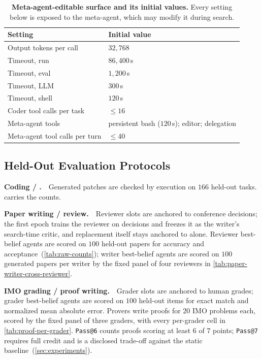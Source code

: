 \begin{table}[ht]
\centering
\caption{\textbf{Meta-agent-editable surface and its initial values.} Every setting below is exposed to the meta-agent, which may modify it during search.}
\label{tab:settings-editable}
\small
\begin{tabular}{@{}ll@{}}
\toprule
Setting & Initial value \\
\midrule
Output tokens per call & $32{,}768$  \\
Timeout, run & $86{,}400$\,s \\
Timeout, eval & $1{,}200$\,s \\
Timeout, LLM & $300$\,s \\
Timeout, shell & $120$\,s \\
Coder tool calls per task & $\leq 16$ \\
Meta-agent tools & persistent bash ($120$\,s); editor; delegation \\
Meta-agent tool calls per turn & $\leq 40$ \\
\bottomrule
\end{tabular}
\end{table}

\subsection{Held-Out Evaluation Protocols}
\label{app:domain-protocols}

\noindent\textbf{Coding / \polyglot.}~~Generated patches are checked by execution on $166$ held-out tasks.  carries the counts.

\noindent\textbf{Paper writing / review.}~~Reviewer slots are anchored to \apres conference decisions; the first epoch trains the reviewer on \apres decisions and freezes it as the writer's search-time critic, and replacement itself stays anchored to \apres alone. Reviewer best-belief agents are scored on $100$ held-out \apres papers for accuracy and acceptance~(\cref{tab:raw-counts}); writer best-belief agents are scored on $100$ generated papers per writer by the fixed panel of four reviewers in \cref{tab:paper-writer-cross-reviewer}.

\noindent\textbf{IMO grading / proof writing.}~~Grader slots are anchored to \imogradbench human grades; grader best-belief agents are scored on $100$ held-out items for exact match and normalized mean absolute error. Provers write proofs for $20$ IMO problems each, scored by the fixed panel of three graders, with every per-grader cell in \cref{tab:proof-per-grader}. \texttt{Pass@6} counts proofs scoring at least $6$ of $7$ points; \texttt{Pass@7} requires full credit and is a disclosed trade-off against the static baseline~(\cref{sec:experiments}).

